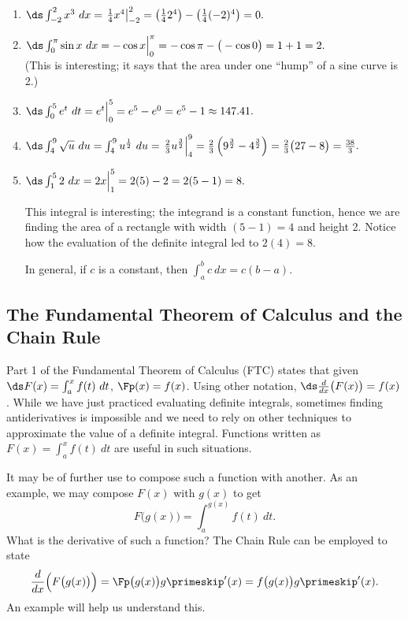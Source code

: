 {\begin{enumerate}
\item	$\ds \int_{-2}^2 x^3\ dx = \left.\frac14x^4\right|_{-2}^2 = \left(\frac142^4\right) - \left(\frac14(-2)^4\right) = 0.$
\item	$\ds \int_0^\pi \sin x\ dx = -\cos x\Big|_0^\pi = -\cos \pi- \big(-\cos 0\big) = 1+1=2.$ \\
(This is interesting; it says that the area under one ``hump'' of a sine curve is 2.)
\item	$\ds \int_0^5e^t\ dt = e^t\Big|_0^5 = e^5 - e^0 = e^5-1 \approx 147.41.$
\item	$\ds \int_4^9 \sqrt{u}\ du = \int_4^9 u^\frac12\ du = \left.\frac23u^\frac32\right|_4^9 = \frac23\left(9^\frac32-4^\frac32\right) = \frac23\big(27-8\big) =\frac{38}3.$
\item	$\ds \int_1^5 2\ dx = 2x\Big|_1^5 = 2(5)-2=2(5-1)=8.$ 

This integral is interesting; the integrand is a constant function, hence we are finding the area of a rectangle with width $(5-1)=4$ and height 2. Notice how the evaluation of the definite integral led to $2(4)=8$. 

In general, if $c$ is a constant, then $\int_a^b c\ dx = c(b-a)$.\eoehere
\end{enumerate}}

\subsection*{The Fundamental Theorem of Calculus and the Chain Rule}

Part 1 of the Fundamental Theorem of Calculus (FTC) states that given $\ds F(x) = \int_a^x f(t)\ dt$,  $\Fp(x) = f(x)$. Using other notation, $\ds \frac{d}{dx}\big(F(x)\big) = f(x)$. While we have just practiced evaluating definite integrals, sometimes finding antiderivatives is impossible and we need to rely on other techniques to approximate the value of a definite integral. Functions written as $F(x) = \int_a^x f(t)\ dt$ are useful in such situations.

It may be of further use to compose such a function with another. As an example, we may compose $F(x)$ with $g(x)$ to get $$F\big(g(x)\big) = \int_a^{g(x)} f(t)\ dt.$$ What is the derivative of such a function? The Chain Rule can be employed to state
\[
\frac{d}{dx}\Big(F\big(g(x)\big)\Big) = \Fp\big(g(x)\big)g\primeskip'(x)
= f\big(g(x)\big)g\primeskip'(x).
\]
An example will help us understand this.

